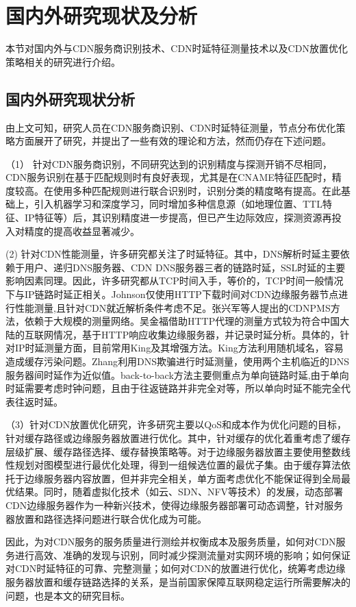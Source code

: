 
\section{国内外研究现状及分析}

本节对国内外与CDN服务商识别技术、CDN时延特征测量技术以及CDN放置优化策略相关的研究进行介绍。

 


 

\subsection{国内外研究现状分析}
由上文可知，研究人员在CDN服务商识别、CDN时延特征测量，节点分布优化策略方面展开了研究，并提出了一些有效的理论和方法，然而仍存在下述问题。

（1） 针对CDN服务商识别，不同研究达到的识别精度与探测开销不尽相同，CDN服务识别在基于匹配规则时有良好表现，尤其是在CNAME特征匹配时，精度较高。在使用多种匹配规则进行联合识别时，识别分类的精度略有提高。在此基础上，引入机器学习和深度学习，同时增加多种信息源（如地理位置、TTL特征、IP特征等）后，其识别精度进一步提高，但已产生边际效应，探测资源再投入对精度的提高收益显著减少。

(2) 针对CDN性能测量，许多研究都关注了时延特征。其中，DNS解析时延主要依赖于用户、递归DNS服务器、CDN DNS服务器三者的链路时延，SSL时延的主要影响因素同理。因此，许多研究都从TCP时间入手，等价的，TCP时间一般情况下与IP链路时延正相关。Johnson\cite{Johnson-2001-cdn-measure}仅使用HTTP下载时间对CDN边缘服务器节点进行性能测量,且针对CDN就近解析条件考虑不足。张兴军\cite{2005内容分发网络性能测量方法研究与实现}等人提出的CDNPMS方法，依赖于大规模的测量网络。吴金福\cite{吴金福2014中国大陆}借助HTTP代理的测量方式较为符合中国大陆的互联网情况，基于HTTP响应收集边缘服务器，并记录时延分析。具体的，针对IP时延测量方面，目前常用King及其增强方法。King方法利用随机域名，容易造成缓存污染\cite{Huang2008}问题。Zhang\cite{Zhang-2021-Scale-platform}利用DNS欺骗进行时延测量，使用两个主机临近的DNS服务器间时延作为近似值。back-to-back\cite{康梦晓2014IP}方法主要侧重点为单向链路时延,由于单向时延需要考虑时钟问题，且由于往返链路并非完全对等\cite{胡治国2017IP}，所以单向时延不能完全代表往返时延。

（3）针对CDN放置优化研究，许多研究主要以QoS和成本作为优化问题的目标，针对缓存路径或边缘服务器放置进行优化。其中，针对缓存的优化着重考虑了缓存层级扩展、缓存路径选择、缓存替换策略等。对于边缘服务器放置主要使用整数线性规划对图模型进行最优化处理，得到一组候选位置的最优子集。由于缓存算法依托于边缘服务器内容放置，但并非完全相关，单方面考虑优化不能保证得到全局最优结果。同时，随着虚拟化技术（如云、SDN、NFV等技术）的发展，动态部署CDN边缘服务器作为一种新兴技术，使得边缘服务器部署可动态调整，针对服务器放置和路径选择问题进行联合优化成为可能。

 
因此，为对CDN服务的服务质量进行测绘并权衡成本及服务质量，如何对CDN服务进行高效、准确的发现与识别，同时减少探测流量对实网环境的影响；如何保证对CDN时延特征的可靠、完整测量；如何对CDN的放置进行优化，统筹考虑边缘服务器放置和缓存链路选择的关系，是当前国家保障互联网稳定运行所需要解决的问题，也是本文的研究目标。 


